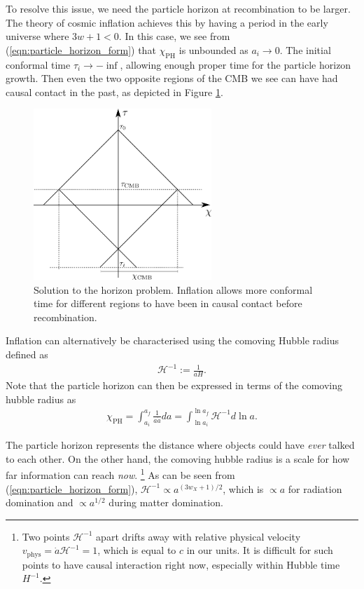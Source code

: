 To resolve this issue, we need the particle horizon at recombination to be larger. The theory of cosmic inflation achieves this by having a period in the early universe where $3w+1<0$. In this case, we see from (\ref{eqn:particle_horizon_form}) that $\chi_\text{PH}$ is unbounded as $a_i \rightarrow 0$. The initial conformal time $\tau_i \rightarrow -\inf$, allowing enough proper time for the particle horizon growth. Then even the two opposite regions of the CMB we see can have had causal contact in the past, as depicted in Figure \ref{fig:horizon_solution}.
\begin{figure}[htbp!] 
	\centering    
	\includegraphics[width=0.6\textwidth]{horizon_solution.png}
	\caption{Solution to the horizon problem. Inflation allows more conformal time for different regions to have been in causal contact before recombination.}
	\label{fig:horizon_solution}
\end{figure}

Inflation can alternatively be characterised using the comoving Hubble radius defined as
\begin{align}
	\mathcal{H}^{-1} := \frac{1}{aH}.
\end{align}
Note that the particle horizon can then be expressed in terms of the comoving hubble radius as
\begin{align}
	\chi_\text{PH} = \int_{a_i}^{a_f} \frac{1}{a \dot{a}} da = \int_{\ln a_i}^{\ln a_f} \mathcal{H}^{-1} d\ln a. \label{eqn:particle_horizon_comoving_hubble}
\end{align}

The particle horizon represents the distance where objects could have \textit{ever} talked to each other. On the other hand, the comoving hubble radius is a scale for how far information can reach \textit{now}. \footnote{Two points $\mathcal{H}^{-1}$ apart drifts away with relative physical velocity $v_\text{phys} = \dot{a} \mathcal{H}^{-1} = 1$, which is equal to $c$ in our units. It is difficult for such points to have causal interaction right now, especially within Hubble time $H^{-1}$.} As can be seen from (\ref{eqn:particle_horizon_form}), $\mathcal{H}^{-1} \propto a^{(3w_X+1)/2}$, which is $\propto a$ for radiation domination and $\propto a^{1/2}$ during matter domination.

